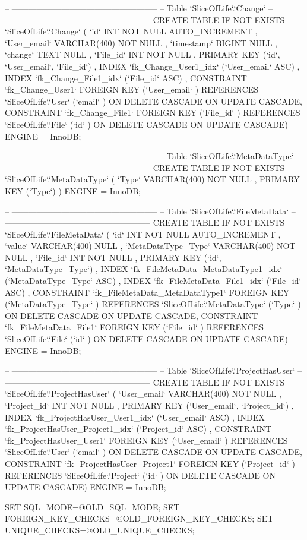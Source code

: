 \begin{spverbatim}
-- -----------------------------------------------------
-- Table `SliceOfLife`.`Change`
-- -----------------------------------------------------
CREATE  TABLE IF NOT EXISTS `SliceOfLife`.`Change` (
  `id` INT NOT NULL AUTO_INCREMENT ,
  `User_email` VARCHAR(400) NOT NULL ,
  `timestamp` BIGINT NULL ,
  `change` TEXT NULL ,
  `File_id` INT NOT NULL ,
  PRIMARY KEY (`id`, `User_email`, `File_id`) ,
  INDEX `fk_Change_User1_idx` (`User_email` ASC) ,
  INDEX `fk_Change_File1_idx` (`File_id` ASC) ,
  CONSTRAINT `fk_Change_User1`
    FOREIGN KEY (`User_email` )
    REFERENCES `SliceOfLife`.`User` (`email` )
    ON DELETE CASCADE
    ON UPDATE CASCADE,
  CONSTRAINT `fk_Change_File1`
    FOREIGN KEY (`File_id` )
    REFERENCES `SliceOfLife`.`File` (`id` )
    ON DELETE CASCADE
    ON UPDATE CASCADE)
ENGINE = InnoDB;


-- -----------------------------------------------------
-- Table `SliceOfLife`.`MetaDataType`
-- -----------------------------------------------------
CREATE  TABLE IF NOT EXISTS `SliceOfLife`.`MetaDataType` (
  `Type` VARCHAR(400) NOT NULL ,
  PRIMARY KEY (`Type`) )
ENGINE = InnoDB;


-- -----------------------------------------------------
-- Table `SliceOfLife`.`FileMetaData`
-- -----------------------------------------------------
CREATE  TABLE IF NOT EXISTS `SliceOfLife`.`FileMetaData` (
  `id` INT NOT NULL AUTO_INCREMENT ,
  `value` VARCHAR(400) NULL ,
  `MetaDataType_Type` VARCHAR(400) NOT NULL ,
  `File_id` INT NOT NULL ,
  PRIMARY KEY (`id`, `MetaDataType_Type`) ,
  INDEX `fk_FileMetaData_MetaDataType1_idx` (`MetaDataType_Type` ASC) ,
  INDEX `fk_FileMetaData_File1_idx` (`File_id` ASC) ,
  CONSTRAINT `fk_FileMetaData_MetaDataType1`
    FOREIGN KEY (`MetaDataType_Type` )
    REFERENCES `SliceOfLife`.`MetaDataType` (`Type` )
    ON DELETE CASCADE
    ON UPDATE CASCADE,
  CONSTRAINT `fk_FileMetaData_File1`
    FOREIGN KEY (`File_id` )
    REFERENCES `SliceOfLife`.`File` (`id` )
    ON DELETE CASCADE
    ON UPDATE CASCADE)
ENGINE = InnoDB;


-- -----------------------------------------------------
-- Table `SliceOfLife`.`ProjectHasUser`
-- -----------------------------------------------------
CREATE  TABLE IF NOT EXISTS `SliceOfLife`.`ProjectHasUser` (
  `User_email` VARCHAR(400) NOT NULL ,
  `Project_id` INT NOT NULL ,
  PRIMARY KEY (`User_email`, `Project_id`) ,
  INDEX `fk_ProjectHasUser_User1_idx` (`User_email` ASC) ,
  INDEX `fk_ProjectHasUser_Project1_idx` (`Project_id` ASC) ,
  CONSTRAINT `fk_ProjectHasUser_User1`
    FOREIGN KEY (`User_email` )
    REFERENCES `SliceOfLife`.`User` (`email` )
    ON DELETE CASCADE
    ON UPDATE CASCADE,
  CONSTRAINT `fk_ProjectHasUser_Project1`
    FOREIGN KEY (`Project_id` )
    REFERENCES `SliceOfLife`.`Project` (`id` )
    ON DELETE CASCADE
    ON UPDATE CASCADE)
ENGINE = InnoDB;



SET SQL_MODE=@OLD_SQL_MODE;
SET FOREIGN_KEY_CHECKS=@OLD_FOREIGN_KEY_CHECKS;
SET UNIQUE_CHECKS=@OLD_UNIQUE_CHECKS;

\end{spverbatim}
\newpage
